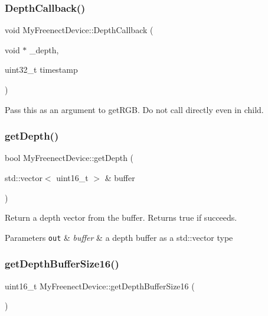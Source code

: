 \subsubsection{\texorpdfstring{Depth\+Callback()}{DepthCallback()}}
{\footnotesize\ttfamily void My\+Freenect\+Device\+::\+Depth\+Callback (\begin{DoxyParamCaption}\item[{void $\ast$}]{\+\_\+depth,  }\item[{uint32\+\_\+t}]{timestamp }\end{DoxyParamCaption})\hspace{0.3cm}{\ttfamily [inline]}}

Pass this as an argument to get\+R\+GB. Do not call directly even in child. \hypertarget{class_my_freenect_device_a657260af4e8e86746de4e33ce14352b7}{}\label{class_my_freenect_device_a657260af4e8e86746de4e33ce14352b7} 
\subsubsection{\texorpdfstring{get\+Depth()}{getDepth()}}
{\footnotesize\ttfamily bool My\+Freenect\+Device\+::get\+Depth (\begin{DoxyParamCaption}\item[{std\+::vector$<$ uint16\+\_\+t $>$ \&}]{buffer }\end{DoxyParamCaption})\hspace{0.3cm}{\ttfamily [inline]}}

Return a depth vector from the buffer. Returns true if succeeds. 
\begin{DoxyParams}[1]{Parameters}
\mbox{\tt out}  & {\em buffer} & a depth buffer as a std\+::vector type \\
\hline
\end{DoxyParams}
\hypertarget{class_my_freenect_device_ad6393488b43e6aa249c01778c8355fdf}{}\label{class_my_freenect_device_ad6393488b43e6aa249c01778c8355fdf} 
\subsubsection{\texorpdfstring{get\+Depth\+Buffer\+Size16()}{getDepthBufferSize16()}}
{\footnotesize\ttfamily uint16\+\_\+t My\+Freenect\+Device\+::get\+Depth\+Buffer\+Size16 (\begin{DoxyParamCaption}{ }\end{DoxyParamCaption})\hspace{0.3cm}{\ttfamily [inline]}}

